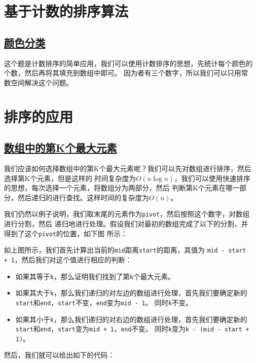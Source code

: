 \documentclass[../../main.tex]{subfiles}
\begin{document}


\section{基于计数的排序算法}

\subsection{\href{https://leetcode.cn/problems/sort-colors/}{颜色分类}}

这个题是计数排序的简单应用，我们可以使用计数排序的思想，先统计每个颜色的个数，然后再将其填充到数组中即可。
因为者有三个数字，所以我们可以只用常数空间解决这个问题。



\section{排序的应用}

\subsection{\href{https://leetcode.cn/problems/kth-largest-element-in-an-array/}
{数组中的第K个最大元素}}

我们应该如何选择数组中的第K个最大元素呢？我们可以先对数组进行排序，然后选择第K个元素，但是这样的
时间复杂度为$O(n\log n)$，我们可以使用快速排序的思想，每次选择一个元素，将数组分为两部分，然后
判断第K个元素在哪一部分，然后递归的进行查找。这样时间的复杂度为$O(n)$。

我们仍然以例子说明，我们取末尾的元素作为\texttt{pivot}，然后按照这个数字，对数组进行分割，然后
递归地进行处理。假设我们对最初的数组完成了以下的分割，并得到了这个\texttt{pivot}的位置，如下图
所示：


如上图所示，我们首先计算出当前的\texttt{mid}距离\texttt{start}的距离，其值为
\texttt{mid - start + 1}，然后我们对这个值进行相应的判断：

\begin{itemize}
  \item 如果其等于\texttt{k}，那么证明我们找到了第\texttt{k}个最大元素。
  \item 如果其大于\texttt{k}，那么我们递归的对左边的数组进行处理，首先我们要确定新的
  \texttt{start}和\texttt{end}，\texttt{start}不变，\texttt{end}变为\texttt{mid - 1}。
  同时\texttt{k}不变。
  \item 如果其小于\texttt{k}，那么我们递归的对右边的数组进行处理，首先我们要确定新的
  \texttt{start}和\texttt{end}，\texttt{start}变为\texttt{mid + 1}，\texttt{end}不变。
  同时\texttt{k}变为\texttt{k - (mid - start + 1)}。
\end{itemize}

然后，我们就可以给出如下的代码：


\end{document}
